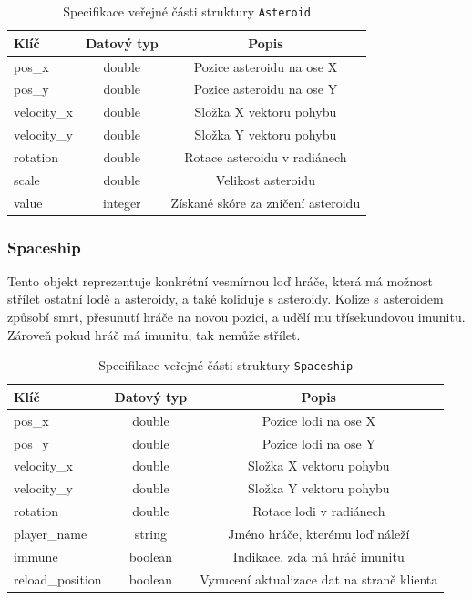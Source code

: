 \documentclass[12pt, a4paper]{article}
\begin{document}
    \begin{table}[H]
        \centering
        \begin{tabular}{|l|c|c|}
            \hline
            Klíč & Datový typ & Popis\\
            \hline
            \hline
            pos\_x & double & Pozice asteroidu na ose X\\
            \hline
            pos\_y & double & Pozice asteroidu na ose Y\\
            \hline
            velocity\_x & double & Složka X vektoru pohybu\\
            \hline
            velocity\_y & double & Složka Y vektoru pohybu\\
            \hline
            rotation & double & Rotace asteroidu v radiánech\\
            \hline
            scale & double & Velikost asteroidu\\
            \hline
            value & integer & Získané skóre za zničení asteroidu\\
            \hline
        \end{tabular}
        \caption{Specifikace veřejné části struktury \texttt{Asteroid}}
    \end{table}

    \subsubsection*{Spaceship}
    Tento objekt reprezentuje konkrétní vesmírnou loď hráče, která má možnost střílet ostatní lodě a asteroidy, a také koliduje s asteroidy.
    Kolize s asteroidem způsobí smrt, přesunutí hráče na novou pozici, a udělí mu třísekundovou imunitu.
    Zároveň pokud hráč má imunitu, tak nemůže střílet.

    \begin{table}[H]
        \centering
        \begin{tabular}{|l|c|c|}
            \hline
            Klíč & Datový typ & Popis\\
            \hline
            \hline
            pos\_x & double & Pozice lodi na ose X\\
            \hline
            pos\_y & double & Pozice lodi na ose Y\\
            \hline
            velocity\_x & double & Složka X vektoru pohybu\\
            \hline
            velocity\_y & double & Složka Y vektoru pohybu\\
            \hline
            rotation & double & Rotace lodi v radiánech\\
            \hline
            player\_name & string & Jméno hráče, kterému loď náleží\\
            \hline
            immune & boolean & Indikace, zda má hráč imunitu\\
            \hline
            reload\_position & boolean & Vynucení aktualizace dat na straně klienta\\
            \hline
        \end{tabular}
        \caption{Specifikace veřejné části struktury \texttt{Spaceship}}
    \end{table}
\end{document}
